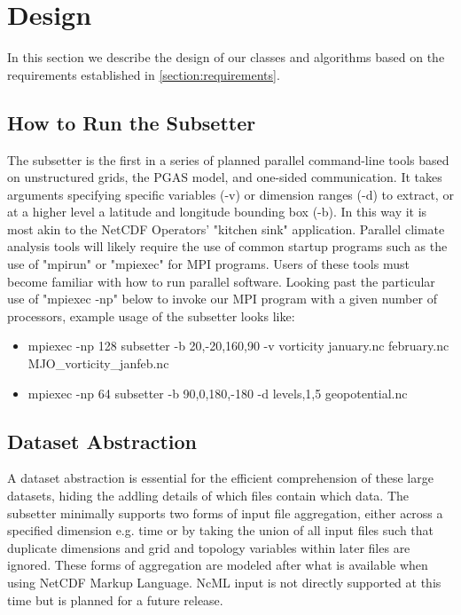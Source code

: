 \section{Design}
\label{section:design}

In this section we describe the design of our classes and algorithms based on
the requirements established in \ref{section:requirements}.

\subsection{How to Run the Subsetter}

The subsetter is the first in a series of planned parallel command-line tools
based on unstructured grids, the PGAS model, and one-sided communication.  It
takes arguments specifying specific variables (-v) or dimension ranges (-d) to
extract, or at a higher level a latitude and longitude bounding box (-b).  In
this way it is most akin to the NetCDF Operators' "kitchen sink"
application\cite{NCO}.  Parallel climate analysis tools will likely require
the use of common startup programs such as the use of "mpirun" or "mpiexec"
for MPI programs.  Users of these tools must become familiar with how to run
parallel software.  Looking past the particular use of "mpiexec -np" below to
invoke our MPI program with a given number of processors, example usage of the
subsetter looks like:

\begin{itemize}
\item mpiexec -np 128 subsetter -b 20,-20,160,90 -v vorticity january.nc february.nc MJO\_vorticity\_janfeb.nc
\item mpiexec -np 64 subsetter -b 90,0,180,-180 -d levels,1,5 geopotential.nc
\end{itemize}

\subsection{Dataset Abstraction}

A dataset abstraction is essential for the efficient comprehension of these
large datasets, hiding the addling details of which files contain which data.
The subsetter minimally supports two forms of input file aggregation, either
across a specified dimension e.g. time or by taking the union of all input
files such that duplicate dimensions and grid and topology variables within
later files are ignored.  These forms of aggregation are modeled after what is
available when using NetCDF Markup Language\cite{NcML}.  NcML input is not
directly supported at this time but is planned for a future release. 

